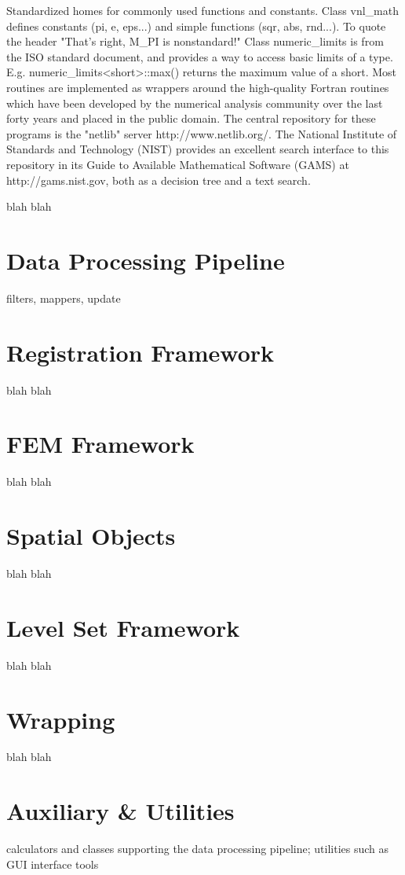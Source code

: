 Standardized homes for commonly used functions and constants. Class vnl_math defines constants (pi, e, eps...) and simple functions (sqr, abs, rnd...). To quote the header "That's right, M_PI is nonstandard!" Class numeric_limits is from the ISO standard document, and provides a way to access basic limits of a type. E.g. numeric_limits<short>::max() returns the maximum value of a short. 
Most routines are implemented as wrappers around the high-quality Fortran routines which have been developed by the numerical analysis community over the last forty years and placed in the public domain. The central repository for these programs is the "netlib" server http://www.netlib.org/. The National Institute of Standards and Technology (NIST) provides an excellent search interface to this repository in its Guide to Available Mathematical Software (GAMS) at http://gams.nist.gov, both as a decision tree and a text search. 

blah blah

\section{Data Processing Pipeline}
\label{sec:DataProcessingPipeline}

filters, mappers, update

\section{Registration Framework}
\label{sec:RegistrationFramework}

blah blah

\section{FEM Framework}
\label{sec:FEMFramework}

blah blah

\section{Spatial Objects}
\label{sec:SpatialObjects}

blah blah

\section{Level Set Framework}
\label{sec:LevelSetFramework}

blah blah

\section{Wrapping}
\label{sec:Wrapping}

blah blah

\section{Auxiliary \& Utilities}
\label{sec:Auxiliary}
\label{sec:Utilities}

calculators and classes supporting the data processing pipeline;
utilities such as GUI interface tools

